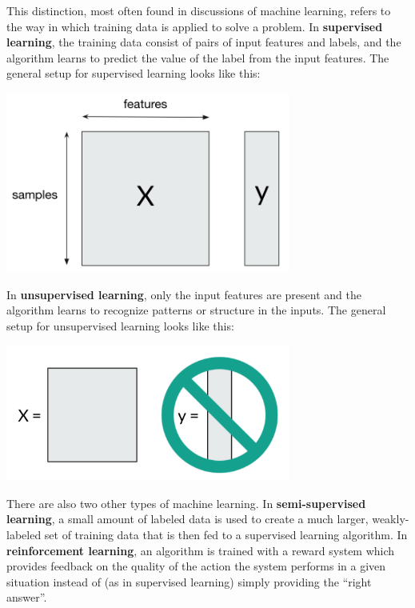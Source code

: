 This distinction, most often found in discussions of machine learning, refers to the way in which training data is applied to solve a problem. In \textbf{supervised learning}, the training data consist of pairs of input features and labels, and the algorithm learns to predict the value of the label from the input features. The general setup for supervised learning looks like this:
\begin{center}
\includegraphics[width=0.7\textwidth]{img/supervised-learning.png}
\end{center}

In \textbf{unsupervised learning}, only the input features are present and the algorithm learns to recognize patterns or structure in the inputs. The general setup for unsupervised learning looks like this:
\begin{center}
\includegraphics[width=0.7\textwidth]{img/unsupervised-learning-diagram.png}
\end{center}

There are also two other types of machine learning. In \textbf{semi-supervised learning}, a small amount of labeled data is used to create a much larger, weakly-labeled set of training data that is then fed to a supervised learning algorithm. In \textbf{reinforcement learning}, an algorithm is trained with a reward system which provides feedback on the quality of the action the system performs in a given situation instead of (as in supervised learning) simply providing the ``right answer''. 





 

